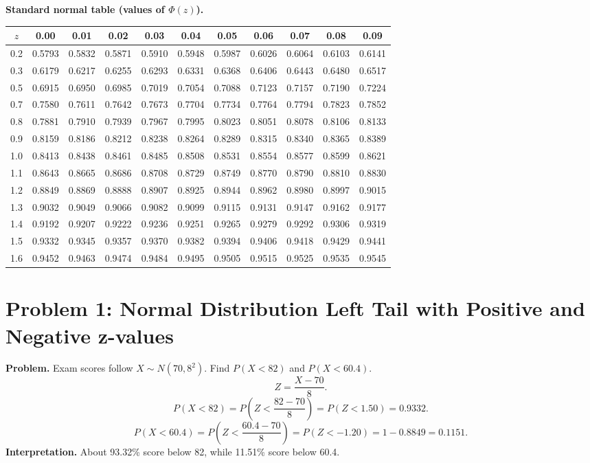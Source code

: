 \noindent\textbf{Standard normal table (values of \(\Phi(z)\)).}
\begin{center}\scriptsize
\begin{tabular}{c|cccccccccc}
\(z\) & 0.00 & 0.01 & 0.02 & 0.03 & 0.04 & 0.05 & 0.06 & 0.07 & 0.08 & 0.09\\\hline
0.2 & 0.5793 & 0.5832 & 0.5871 & 0.5910 & 0.5948 & 0.5987 & 0.6026 & 0.6064 & 0.6103 & 0.6141\\
0.3 & 0.6179 & 0.6217 & 0.6255 & 0.6293 & 0.6331 & 0.6368 & 0.6406 & 0.6443 & 0.6480 & 0.6517\\
0.5 & 0.6915 & 0.6950 & 0.6985 & 0.7019 & 0.7054 & 0.7088 & 0.7123 & 0.7157 & 0.7190 & 0.7224\\
0.7 & 0.7580 & 0.7611 & 0.7642 & 0.7673 & 0.7704 & 0.7734 & 0.7764 & 0.7794 & 0.7823 & 0.7852\\
0.8 & 0.7881 & 0.7910 & 0.7939 & 0.7967 & 0.7995 & 0.8023 & 0.8051 & 0.8078 & 0.8106 & 0.8133\\
0.9 & 0.8159 & 0.8186 & 0.8212 & 0.8238 & 0.8264 & 0.8289 & 0.8315 & 0.8340 & 0.8365 & 0.8389\\
1.0 & 0.8413 & 0.8438 & 0.8461 & 0.8485 & 0.8508 & 0.8531 & 0.8554 & 0.8577 & 0.8599 & 0.8621\\
1.1 & 0.8643 & 0.8665 & 0.8686 & 0.8708 & 0.8729 & 0.8749 & 0.8770 & 0.8790 & 0.8810 & 0.8830\\
1.2 & 0.8849 & 0.8869 & 0.8888 & 0.8907 & 0.8925 & 0.8944 & 0.8962 & 0.8980 & 0.8997 & 0.9015\\
1.3 & 0.9032 & 0.9049 & 0.9066 & 0.9082 & 0.9099 & 0.9115 & 0.9131 & 0.9147 & 0.9162 & 0.9177\\
1.4 & 0.9192 & 0.9207 & 0.9222 & 0.9236 & 0.9251 & 0.9265 & 0.9279 & 0.9292 & 0.9306 & 0.9319\\
1.5 & 0.9332 & 0.9345 & 0.9357 & 0.9370 & 0.9382 & 0.9394 & 0.9406 & 0.9418 & 0.9429 & 0.9441\\
1.6 & 0.9452 & 0.9463 & 0.9474 & 0.9484 & 0.9495 & 0.9505 & 0.9515 & 0.9525 & 0.9535 & 0.9545
\end{tabular}\end{center}

\section{Problem 1: Normal Distribution Left Tail with Positive and Negative z-values}
\textbf{Problem.} Exam scores follow \(X\sim N(70,8^2)\). Find \(P(X<82)\) and \(P(X<60.4)\).\\
\[Z=\frac{X-70}{8}.\]
\[P(X<82)=P\!\left(Z<\frac{82-70}{8}\right)=P(Z<1.50)=0.9332.\]
\[P(X<60.4)=P\!\left(Z<\frac{60.4-70}{8}\right)=P(Z<-1.20)=1-0.8849=0.1151.\]
\textbf{Interpretation.} About 93.32\% score below 82, while 11.51\% score below 60.4.

